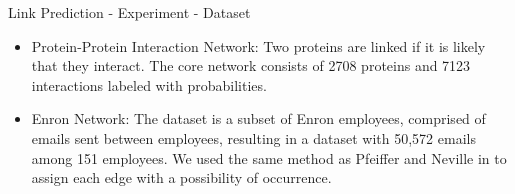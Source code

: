 \documentclass[9pt]{beamer}
\begin{document}






\begin{frame}{Link Prediction - Experiment - Dataset}
\begin{itemize}
\item Protein-Protein Interaction Network: Two proteins are linked if it is likely that they interact. The core network consists of 2708 proteins and 7123 interactions labeled with probabilities.

\item Enron Network: The dataset is a subset of Enron employees, comprised of emails sent between employees, resulting in a dataset with 50,572 emails among 151 employees. We used the same method as Pfeiffer and Neville in  \cite{pfeiffer2010probabilistic} to assign each edge with a possibility of occurrence. 

\end{itemize}

\end{frame}
\end{document}
